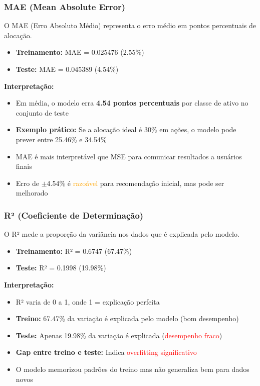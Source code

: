 \documentclass[12pt]{article}
\begin{document}
\subsubsection*{MAE (Mean Absolute Error)}

O MAE (Erro Absoluto Médio) representa o erro médio em pontos percentuais de alocação.

\begin{itemize}
    \item \textbf{Treinamento:} MAE = 0.025476 (2.55\%)
    \item \textbf{Teste:} MAE = 0.045389 (4.54\%)
\end{itemize}

\textbf{Interpretação:}
\begin{itemize}
    \item Em média, o modelo erra \textbf{4.54 pontos percentuais} por classe de ativo no conjunto de teste
    \item \textbf{Exemplo prático:} Se a alocação ideal é 30\% em ações, o modelo pode prever entre 25.46\% e 34.54\%
    \item MAE é mais interpretável que MSE para comunicar resultados a usuários finais
    \item Erro de $\pm$4.54\% é \textcolor{orange}{razoável} para recomendação inicial, mas pode ser melhorado
\end{itemize}

\subsubsection*{R² (Coeficiente de Determinação)}

O R² mede a proporção da variância nos dados que é explicada pelo modelo.

\begin{itemize}
    \item \textbf{Treinamento:} R² = 0.6747 (67.47\%)
    \item \textbf{Teste:} R² = 0.1998 (19.98\%)
\end{itemize}

\textbf{Interpretação:}
\begin{itemize}
    \item R² varia de 0 a 1, onde 1 = explicação perfeita
    \item \textbf{Treino:} 67.47\% da variação é explicada pelo modelo (bom desempenho)
    \item \textbf{Teste:} Apenas 19.98\% da variação é explicada (\textcolor{red}{desempenho fraco})
    \item \textbf{Gap entre treino e teste:} Indica \textcolor{red}{overfitting significativo}
    \item O modelo memorizou padrões do treino mas não generaliza bem para dados novos
\end{itemize}
\end{document}
